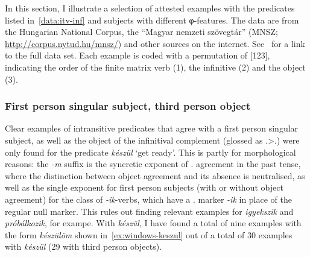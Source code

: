 In this section, I illustrate a selection of attested examples with the
predicates listed in~\eqref{data:itv-inf} and subjects with different
φ-features. The data are from the Hungarian National Corpus, the
\enquote{Magyar nemzeti szövegtár} (MNSZ; \url{http://corpus.nytud.hu/mnsz/})
and other sources on the internet. See~ for a link to the
full data set. Each example is coded with a permutation of [123], indicating
the order of the finite matrix verb (1), the infinitive (2) and the object (3).

\subsubsection{First person singular subject, third person
object}\label{ssub:fsg-obj}

Clear examples of intransitive predicates that agree with a first person
singular subject, as well as the object of the infinitival complement (glossed
as \Fsg.\Sbj>\Third.\Obj) were only found for the predicate \emph{készül}
\enquote*{get ready}. This is partly for morphological reasons: the \emph{-m}
suffix is the syncretic exponent of \Fsg.\Sbj{} agreement in the past tense,
where the distinction between object agreement and its absence is neutralised,
as well as the single exponent for first person subjects (with or without
object agreement) for the class of \emph{-ik}-verbs, which have a \Third.\Sg{}
marker \emph{-ik} in place of the regular null marker. This rules out finding
relevant examples for \emph{igyekszik} and \emph{próbálkozik}, for exampe. With
\emph{készül}, I have found a total of nine examples with the form
\emph{készülöm} shown in~\eqref{ex:windows-keszul} out of a total of 30
examples with \emph{készül} (29 with third person objects).

